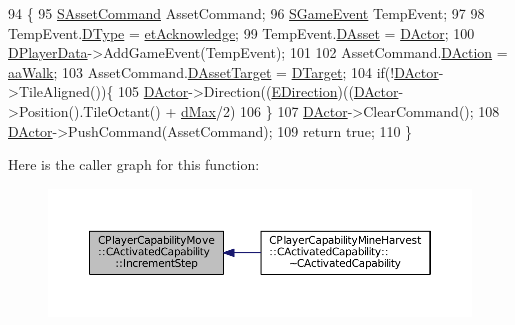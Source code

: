\begin{DoxyCode}
94                                                              \{
95     \hyperlink{structSAssetCommand}{SAssetCommand} AssetCommand;
96     \hyperlink{structSGameEvent}{SGameEvent} TempEvent;
97     
98     TempEvent.\hyperlink{structSGameEvent_afa10562e243f4ac2b473b655cc58fee7}{DType} = \hyperlink{GameModel_8h_abfcf510bafec7c6429906a6ecaac656da9b68fc38f3ca4002cd7a3ec3cc07a612}{etAcknowledge};
99     TempEvent.\hyperlink{structSGameEvent_a40c85eeac83b96887b7449c9bdc5d624}{DAsset} = \hyperlink{classCActivatedPlayerCapability_a54ca944b47bff2718330639941d402b0}{DActor};
100     \hyperlink{classCActivatedPlayerCapability_a9bf27c322a73f4b11c8183cc1973c3d8}{DPlayerData}->AddGameEvent(TempEvent);
101         
102     AssetCommand.\hyperlink{structSAssetCommand_a8edd3b3d59a76d5514ba403bc8076a75}{DAction} = \hyperlink{GameDataTypes_8h_ab47668e651a3032cfb9c40ea2d60d670a60ca9010aa62b73c1aab838ff4bf7276}{aaWalk};
103     AssetCommand.\hyperlink{structSAssetCommand_a3d9b43f6e59c386c48c41a65448a0c39}{DAssetTarget} = \hyperlink{classCActivatedPlayerCapability_a8a1cf50b6501bcfd55af0c935828e395}{DTarget};
104     \textcolor{keywordflow}{if}(!\hyperlink{classCActivatedPlayerCapability_a54ca944b47bff2718330639941d402b0}{DActor}->TileAligned())\{
105         \hyperlink{classCActivatedPlayerCapability_a54ca944b47bff2718330639941d402b0}{DActor}->Direction((\hyperlink{GameDataTypes_8h_acb2b033915f6659a71a38b5aa6e4eb42}{EDirection})((\hyperlink{classCActivatedPlayerCapability_a54ca944b47bff2718330639941d402b0}{DActor}->Position().TileOctant() + 
      \hyperlink{GameDataTypes_8h_acb2b033915f6659a71a38b5aa6e4eb42af6546049275557ce0ade2ceee042a319}{dMax}/2) %
106     \}
107     \hyperlink{classCActivatedPlayerCapability_a54ca944b47bff2718330639941d402b0}{DActor}->ClearCommand();
108     \hyperlink{classCActivatedPlayerCapability_a54ca944b47bff2718330639941d402b0}{DActor}->PushCommand(AssetCommand);
109     \textcolor{keywordflow}{return} \textcolor{keyword}{true};
110 \}
\end{DoxyCode}
Here is the caller graph for this function\+:\nopagebreak
\begin{figure}[H]
\begin{center}
\leavevmode
\includegraphics[width=350pt]{classCPlayerCapabilityMove_1_1CActivatedCapability_af4670890b462f59d24195db14aeb436d_icgraph}
\end{center}
\end{figure}
